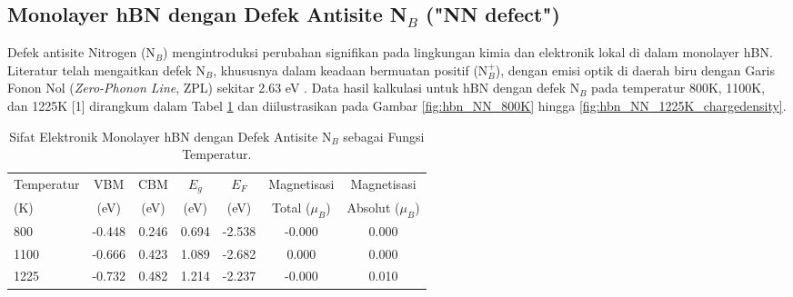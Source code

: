 \subsection{Monolayer hBN dengan Defek Antisite N$_B$ ("NN defect")}
\label{subsec:hbn_defek_nb}
Defek antisite Nitrogen (N$_B$) mengintroduksi perubahan signifikan pada lingkungan kimia dan elektronik lokal di dalam monolayer hBN. Literatur telah mengaitkan defek N$_B$, khususnya dalam keadaan bermuatan positif (N$_B^+$), dengan emisi optik di daerah biru dengan Garis Fonon Nol (\textit{Zero-Phonon Line}, ZPL) sekitar 2.63 eV \cite{[1, 4, 5]}. Data hasil kalkulasi untuk hBN dengan defek N$_B$ pada temperatur 800K, 1100K, dan 1225K [1] dirangkum dalam Tabel \ref{tab:hbn_defek_nb} dan diilustrasikan pada Gambar \ref{fig:hbn_NN_800K} hingga \ref{fig:hbn_NN_1225K_chargedensity}.

\begin{table}[h!]
  \centering
  \caption{Sifat Elektronik Monolayer hBN dengan Defek Antisite N$_B$ sebagai Fungsi Temperatur.}
  \label{tab:hbn_defek_nb}
  \begin{tabular}{lcccccc}
    \toprule
    Temperatur & VBM & CBM & $E_g$ & $E_F$ & Magnetisasi & Magnetisasi \\
    (K) & (eV) & (eV) & (eV) & (eV) & Total ($\mu_B$) & Absolut ($\mu_B$) \\
    \midrule
    800  & -0.448 &  0.246 & 0.694 & -2.538 & -0.000 & 0.000 \\
    1100 & -0.666 &  0.423 & 1.089 & -2.682 &  0.000 & 0.000 \\
    1225 & -0.732 &  0.482 & 1.214 & -2.237 & -0.000 & 0.010 \\
    \bottomrule
  \end{tabular}
\end{table}

